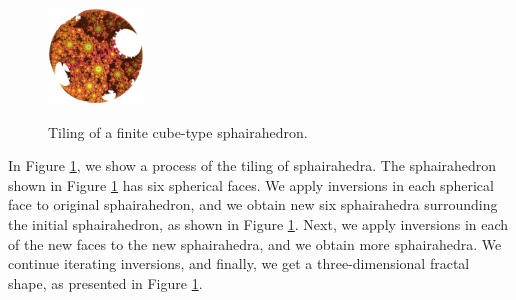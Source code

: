 \documentclass[suppldata, dvipdfmx]{interact}
\theoremstyle{plain}%
\theoremstyle{definition}
\theoremstyle{remark}
\theoremstyle{problemstyle}
\begin{document}
\begin{figure}[H]
 \hspace*{\fill}
 \begin{minipage}[t]{0.18\textwidth}
  \centering
  \includegraphics[width=1in, height=1in, keepaspectratio]{./img/constructFractal/finiteProcess/final.png}
  \label{fig:sphaira-final}
 \end{minipage}
 \hspace*{\fill}
 \caption{Tiling of a finite cube-type sphairahedron.}
 \label{fig:sphairahedronTile}
\end{figure}

In Figure \ref{fig:sphairahedronTile}, we show a process of the tiling of
sphairahedra.
The sphairahedron shown in Figure
\ref{fig:sphairahedronTile} has six spherical
faces.
We apply inversions in each spherical face to original sphairahedron,
and we obtain new six sphairahedra surrounding the initial sphairahedron,
as shown in Figure
\ref{fig:sphairahedronTile}.
Next, we apply inversions in each of the new faces to the new sphairahedra,
and we obtain more sphairahedra.
We continue iterating inversions, and finally, we get a three-dimensional
fractal shape, as presented in Figure
\ref{fig:sphairahedronTile}.
\end{document}
